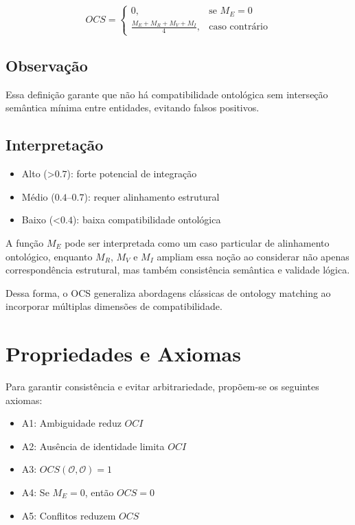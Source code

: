 \documentclass[12pt,a4paper]{article}
\begin{document}
\[
OCS =
\begin{cases}
	0, & \text{se } M_E = 0 \\
	\frac{M_E + M_R + M_V + M_I}{4}, & \text{caso contrário}
\end{cases}
\]

\subsection{Observação}

Essa definição garante que não há compatibilidade ontológica sem interseção semântica mínima entre entidades, evitando falsos positivos.

\subsection{Interpretação}

\begin{itemize}
	\item Alto (>$0.7$): forte potencial de integração
	\item Médio ($0.4$--$0.7$): requer alinhamento estrutural
	\item Baixo (<$0.4$): baixa compatibilidade ontológica
\end{itemize}

A função \(M_E\) pode ser interpretada como um caso particular de alinhamento ontológico, enquanto \(M_R\), \(M_V\) e \(M_I\) ampliam essa noção ao considerar não apenas correspondência estrutural, mas também consistência semântica e validade lógica.

Dessa forma, o OCS generaliza abordagens clássicas de ontology matching ao incorporar múltiplas dimensões de compatibilidade.

\section{Propriedades e Axiomas}

Para garantir consistência e evitar arbitrariedade, propõem-se os seguintes axiomas:

\begin{itemize}
	\item A1: Ambiguidade reduz \(OCI\)
	\item A2: Ausência de identidade limita \(OCI\)
	\item A3: \(OCS(\mathcal{O}, \mathcal{O}) = 1\)
	\item A4: Se \(M_E = 0\), então \(OCS = 0\)
	\item A5: Conflitos reduzem \(OCS\)
\end{itemize}
\end{document}
